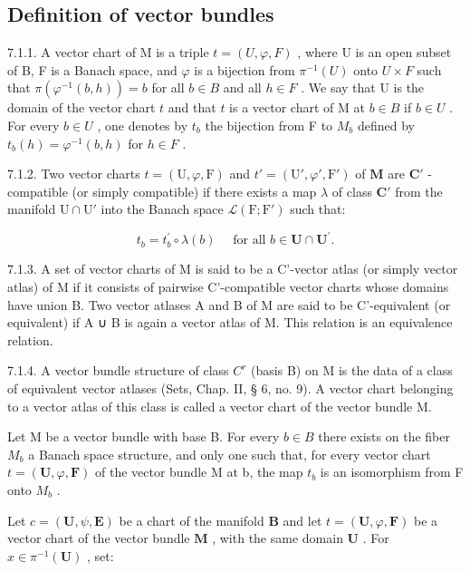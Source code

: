 \subsection{Definition of vector bundles}

7.1.1. A vector chart of M is a triple \(t = (U, \varphi, F)\) , where U is an open subset of B, F is a Banach space, and \(\varphi\) is a bijection from \(\pi^{-1}(U)\) onto \(U \times F\) such that \(\pi(\varphi^{-1}(b, h)) = b\) for all \(b \in B\) and all \(h \in F\) . We say that U is the domain of the vector chart \(t\) and that \(t\) is a vector chart of M at \(b \in B\) if \(b \in U\) . For every \(b \in U\) , one denotes by \(t_b\) the bijection from F to \(M_b\) defined by \(t_b(h) = \varphi^{-1}(b, h)\) for \(h \in F\) .

7.1.2. Two vector charts \(t = (\mathrm{U}, \varphi, \mathrm{F})\) and \(t' = (\mathrm{U}', \varphi', \mathrm{F}')\) of \(\mathbf{M}\) are \(\mathbf{C}'\) -compatible (or simply compatible) if there exists a map \(\lambda\) of class \(\mathbf{C}'\) from the manifold \(\mathrm{U} \cap \mathrm{U}'\) into the Banach space \(\mathcal{L}(\mathrm{F}; \mathrm{F}')\) such that:

\[
t _ {b} = t _ {b} ^ {\prime} \circ \lambda (b) \quad \text { for all } b \in \mathbf {U} \cap \mathbf {U} ^ {\prime}.
\]

7.1.3. A set of vector charts of M is said to be a C'-vector atlas (or simply vector atlas) of M if it consists of pairwise C'-compatible vector charts whose domains have union B. Two vector atlases A and B of M are said to be C'-equivalent (or equivalent) if A ∪ B is again a vector atlas of M. This relation is an equivalence relation.

7.1.4. A vector bundle structure of class \(C^{r}\) (basis B) on M is the data of a class of equivalent vector atlases (Sets, Chap. II, § 6, no. 9). A vector chart belonging to a vector atlas of this class is called a vector chart of the vector bundle M.

Let M be a vector bundle with base B. For every \(b \in B\) there exists on the fiber \(M_{b}\) a Banach space structure, and only one such that, for every vector chart \(t = (\mathbf{U}, \varphi, \mathbf{F})\) of the vector bundle M at b, the map \(t_{b}\) is an isomorphism from F onto \(M_{b}\) .

Let \(c = (\mathbf{U}, \psi, \mathbf{E})\) be a chart of the manifold \(\mathbf{B}\) and let \(t = (\mathbf{U}, \varphi, \mathbf{F})\) be a vector chart of the vector bundle \(\mathbf{M}\) , with the same domain \(\mathbf{U}\) . For \(x \in \pi^{-1}(\mathbf{U})\) , set:

